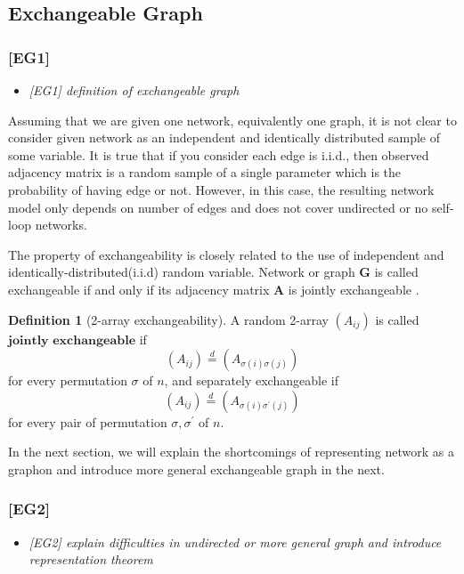 \documentclass[12pt]{article}
\theoremstyle{definition}
\newtheorem{definition}{Definition}[section]
\begin{document}
\subsection{Exchangeable Graph}

\subsubsection{[EG1]}
\begin{itemize}
	\item {\it  [EG1] definition of exchangeable graph \/}
\end{itemize}

Assuming that we are given one network, equivalently one graph, it is not clear to consider given network as an independent and identically distributed sample of some variable. It is true that if you consider each edge is i.i.d., then observed adjacency matrix is a random sample of  a single parameter which is the probability of having edge or not. However, in this case, the resulting network model only depends on number of edges \cite{Orbanz} and does not cover undirected or no self-loop networks.  

 The property of exchangeability is closely related to the use of independent and identically-distributed(i.i.d) random variable. Network or graph $\mathbf{G}$ is called exchangeable if and only if its adjacency matrix $\mathbf{A}$ is jointly exchangeable \cite{Orbanz}. 

\begin{definition}[2-array exchangeability]
	\label{exchangeability}
	A random 2-array $(A_{ij})$ is called $\mathbf{\mbox{jointly exchangeable}}$ if 
	$$(A_{ij}) \stackrel{d}{=} (A_{\sigma(i) \sigma(j)})$$
	for every permutation $\sigma$ of $n$,
	and separately exchangeable if 
	$$(A_{ij}) \stackrel{d}{=} (A_{\sigma(i) \sigma^{\prime}(j) })$$
	for every pair of permutation $\sigma, \sigma^{\prime}$ of $n$.
\end{definition}





In the next section, we will explain the shortcomings of representing network as a graphon and introduce more general exchangeable graph in the next. 


\subsubsection{[EG2]}
\begin{itemize}
	\item {\it  [EG2] explain difficulties in undirected or more general graph and introduce representation theorem \/}
\end{itemize}
\end{document}
